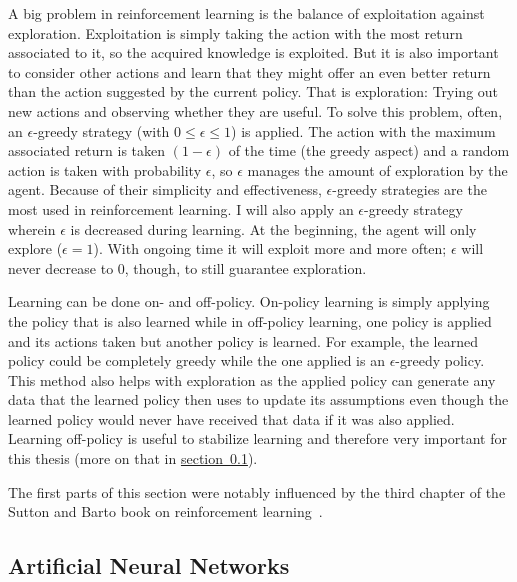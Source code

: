 \documentclass[a4paper,titlepage]{article}
\begin{document}
A big problem in reinforcement learning is the balance of exploitation against exploration. Exploitation is simply taking the action with the most return associated to it, so the acquired knowledge is exploited. But it is also important to consider other actions and learn that they might offer an even better return than the action suggested by the current policy. That is exploration: Trying out new actions and observing whether they are useful. To solve this problem, often, an $\epsilon$-greedy strategy (with $0 \leq \epsilon \leq 1$) is applied. The action with the maximum associated return is taken $(1 - \epsilon)$ of the time (the greedy aspect) and a random action is taken with probability $\epsilon$, so $\epsilon$ manages the amount of exploration by the agent. Because of their simplicity and effectiveness, $\epsilon$-greedy strategies are the most used in reinforcement learning. I will also apply an $\epsilon$-greedy strategy wherein $\epsilon$ is decreased during learning. At the beginning, the agent will only explore ($\epsilon = 1$). With ongoing time it will exploit more and more often; $\epsilon$ will never decrease to 0, though, to still guarantee exploration.

Learning can be done on- and off-policy. On-policy learning is simply applying the policy that is also learned while in off-policy learning, one policy is applied and its actions taken but another policy is learned. For example, the learned policy could be completely greedy while the one applied is an $\epsilon$-greedy policy. This method also helps with exploration as the applied policy can generate any data that the learned policy then uses to update its assumptions even though the learned policy would never have received that data if it was also applied. Learning off-policy is useful to stabilize learning and therefore very important for this thesis (more on that in \hyperref[sec:anns]{section~\ref*{sec:anns}}). \medskip

The first parts of this section were notably influenced by the third chapter of the Sutton and Barto book on reinforcement learning~\cite{book}.

\subsection{Artificial Neural Networks}
\label{sec:anns}
\end{document}
